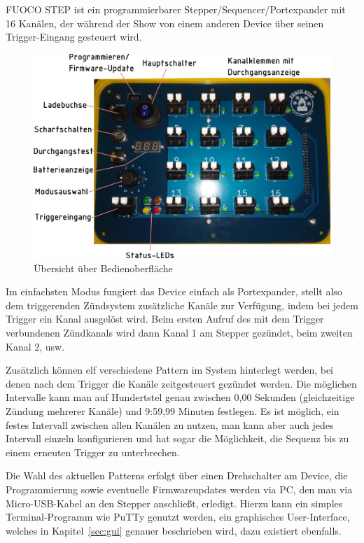 \documentclass[paper=a4, open=any]{scrbook}
\begin{document}
		FUOCO STEP ist ein programmierbarer Stepper/Sequencer/Portexpander mit 16 Kanälen, der während der Show von einem anderen Device über seinen Trigger-Eingang gesteuert wird.

		\begin{figure}[!b]
			\centering\includegraphics[width=\textwidth]{oberflaeche}
			\caption{Übersicht über Bedienoberfläche}
			\label{fig:paneldescription}
		\end{figure}

		Im einfachsten Modus fungiert das Device einfach als Portexpander, stellt also dem triggerenden Zündsystem zusätzliche Kanäle zur Verfügung, indem bei jedem Trigger ein Kanal ausgelöst wird. Beim ersten Aufruf des mit dem Trigger verbundenen Zündkanals wird dann Kanal 1 am Stepper gezündet, beim zweiten Kanal 2, usw.

		Zusätzlich können elf verschiedene Pattern im System hinterlegt werden, bei denen nach dem Trigger die Kanäle zeitgesteuert gezündet werden. Die möglichen Intervalle kann man auf Hundertstel genau zwischen 0,00 Sekunden (gleichzeitige Zündung mehrerer Kanäle) und 9:59,99 Minuten festlegen. Es ist möglich, ein festes Intervall zwischen allen Kanälen zu nutzen, man kann aber auch jedes Intervall einzeln konfigurieren und hat sogar die Möglichkeit, die Sequenz bis zu einem erneuten Trigger zu unterbrechen.

		Die Wahl des aktuellen Patterns erfolgt über einen Drehschalter am Device, die Programmierung sowie eventuelle Firmwareupdates werden via PC, den man via Micro-USB-Kabel an den Stepper anschließt, erledigt. Hierzu kann ein simples Terminal-Programm wie PuTTy genutzt werden, ein graphisches User-Interface, welches in Kapitel~\ref{sec:gui} genauer beschrieben wird, dazu existiert ebenfalls.
\end{document}
